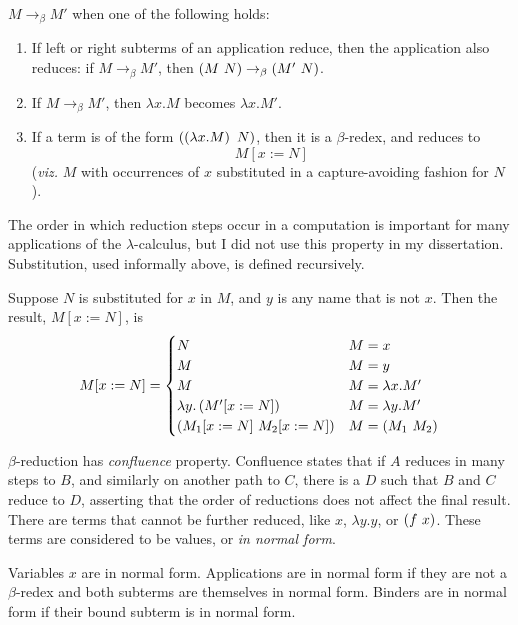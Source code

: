 \begin{definition}
\(M \to_\beta M'\) when one of the following holds:
\begin{enumerate}
\item
If left or right subterms of an application reduce, then the application also reduces: if \(M \to_\beta M'\), then \(\wrap{M\ N} \to_\beta \wrap{M'\ N}\).
\item
If \(M \to_\beta M'\), then \(\lambda x.M\) becomes \(\lambda x.M'\).
\item
If a term is of the form \(\left(\left(\lambda x.M\right)\ N\right)\), then it is a \(\beta\)-redex, and reduces to
\[
M[x := N]
\]
(\emph{viz.} \(M\) with occurrences of \(x\) substituted in a capture-avoiding fashion for \(N\)).
\end{enumerate}
\end{definition}

The order in which reduction steps occur in a computation is important for many applications of the \(\lambda\)-calculus, but I did not use this property in my dissertation.
Substitution, used informally above, is defined recursively.

\begin{definition}
Suppose \(N\) is substituted for \(x\) in \(M\), and \(y\) is any name that is not \(x\).
Then the result, \(M[x := N]\), is
\[
M[x := N] =
\begin{cases}
N & M = x\\
M & M = y\\
M & M = \lambda x. M'\\
\lambda y. \left(M'[x := N]\right) & M = \lambda y. M'\\
\left(M_1[x := N]\  M_2[x := N]\right) & M = \left(M_1\ M_2\right)\\
\end{cases}
\]
\end{definition}

\(\beta\)-reduction has \emph{confluence} property.
Confluence states that if \(A\) reduces in many steps to \(B\), and similarly on another path to \(C\), there is a \(D\) such that \(B\) and \(C\) reduce to \(D\), asserting that the order of reductions does not affect the final result.
There are terms that cannot be further reduced, like \(x\), \(\lambda y.y\), or \(\left(f\ x\right)\).
These terms are considered to be values, or \emph{in normal form}.

\begin{definition}
Variables \(x\) are in normal form.
Applications are in normal form if they are not a \(\beta\)-redex and both subterms are themselves in normal form.
Binders are in normal form if their bound subterm is in normal form.
\end{definition}

